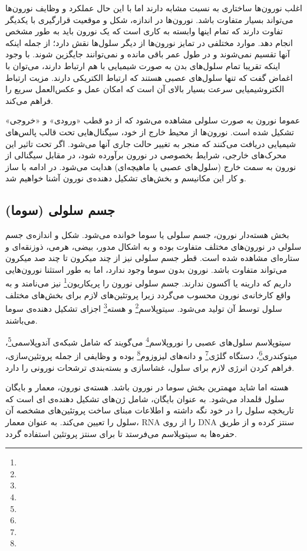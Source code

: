 اغلب نورون‌ها ساختاری به نسبت مشابه دارند اما با این حال عملکرد و وظایف نورون‌ها می‌تواند بسیار متفاوت باشد. نورون‌ها در اندازه، شکل و موقعیت قرارگیری با یکدیگر تفاوت دارند که تمام اینها وابسته به کاری است که یک نورون باید به طور مشخص انجام دهد. موارد مختلفی در تمایز نورون‌ها از دیگر سلول‌ها نقش دارد؛ از جمله اینکه آنها تقسیم نمی‌شوند و در طول عمر باقی مانده و نمی‌توانند جایگزین شوند. با وجود اینکه تقریبا تمام سلول‌های بدن به صورت شیمیایی با هم ارتباط دارند، می‌توان با اغماض گفت که تنها سلول‌های عصبی هستند که ارتباط الکتریکی دارند. مزیت ارتباط الکتروشیمیایی سرعت بسیار بالای آن است که امکان عمل و عکس‌العمل سریع را فراهم می‌کند.

عموما نورون به صورت سلولی مشاهده می‌شود که از دو قطب «ورودی» و «خروجی» تشکیل شده است. نورون‌ها از محیط خارج از خود، سیگنال‌هایی تحت قالب پالس‌های شیمیایی دریافت می‌کنند که منجر به تغییر حالت جاری آنها می‌شود. اگر تحت تاثیر این محرک‌های خارجی، شرایط بخصوصی در نورون برآورده شود، در مقابل سیگنالی از نورون به سمت خارج (سلول‌های عصبی یا ماهیچه‌ای) هدایت می‌شود. در ادامه با ساز و کار این مکانیسم و بخش‌های تشکیل دهنده‌ی نورون آشنا خواهیم شد.

\subsection{جسم سلولی (سوما)}
بخش هسته‌دار نورون، جسم سلولی یا سوما خوانده می‌شود. شکل و اندازه‌ی جسم سلولی در نورون‌های مختلف متفاوت بوده و به اشکال مدور، بیضی، هرمی، ذوزنقه‌ای و ستاره‌ای مشاهده شده است. قطر جسم سلولی نیز از چند میکرون تا چند صد میکرون می‌تواند متفاوت باشد. نورون بدون سوما وجود ندارد، اما به طور استثنا نورون‌هایی داریم که دارینه یا آکسون ندارند. جسم سلولی نورون را پریکاریون\footnote{} نیز می‌نامند و به واقع کارخانه‌ی نورون محسوب می‌گردد زیرا پروتئین‌های لازم برای بخش‌های مختلف سلول توسط آن تولید می‌شود. سیتوپلاسم\footnote{} و هسته\footnote{} اجزای تشکیل دهنده‌ی سوما می‌باشند.

سیتوپلاسم سلول‌های عصبی را نوروپلاسم\footnote{} می‌گویند که شامل شبکه‌ی آندوپلاسمی\footnote{}، میتوکندری\footnote{}، دستگاه گلژی\footnote{} و دانه‌های لیزوزوم\footnote{} بوده و وظایفی از جمله پروتئین‌سازی، فراهم کردن انرژی لازم برای سلول، غشا‌سازی و بسته‌بندی ترشحات نورونی را دارد. 

هسته اما شاید مهمترین بخش سوما در نورون باشد. هسته‌ی نورون، معمار و بایگان سلول قلمداد می‌شود. به عنوان بایگان، شامل ژن‌های تشکیل دهنده‌ی ای است که تاریخچه سلول را در خود نگه داشته و اطلاعات مبنای ساخت پروتئین‌های مشخصه آن سلول را تعیین می‌کند. 
به عنوان معمار، RNA را از روی DNA سنتز کرده و از طریق حفره‌ها به سیتوپلاسم می‌فرستد تا برای سنتز پروتئین استفاده گردد.

